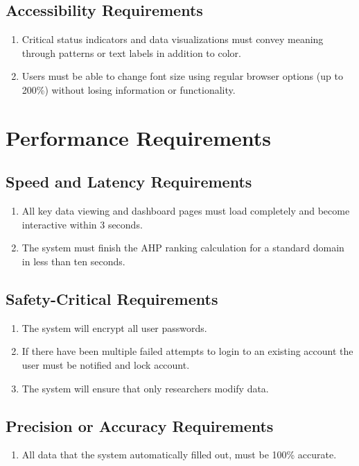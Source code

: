 \documentclass[12pt]{article}
\begin{document}
\subsection{Accessibility Requirements}
\begin{enumerate}[label=UH-AR\arabic*]
  \item Critical status indicators and data visualizations must convey meaning through patterns or text labels in addition to color.
  \item Users must be able to change font size using regular browser options (up to 200\%) without losing information or functionality.
\end{enumerate}

\section{Performance Requirements}
\subsection{Speed and Latency Requirements}
\begin{enumerate}[label=PR-SL\arabic*]
  \item All key data viewing and dashboard pages must load completely and become interactive within 3 seconds.
  \item The system must finish the AHP ranking calculation for a standard domain in less than ten seconds.
\end{enumerate}
\subsection{Safety-Critical Requirements}
\begin{enumerate}[label=PR-SC\arabic*]
  \item The system will encrypt all user passwords.
  \item If there have been multiple failed attempts to login to an existing account the user must be notified and lock account.
  \item The system will ensure that only researchers modify data.
\end{enumerate}\subsection{Precision or Accuracy Requirements}
\begin{enumerate}[label=PR-PA\arabic*]
  \item All data  that the system automatically filled out, must be 100\% accurate.
\end{enumerate}
\end{document}
